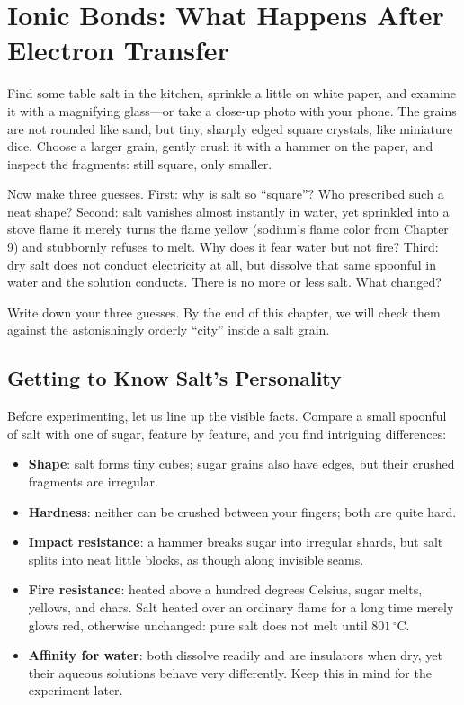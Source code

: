 \chapter{Ionic Bonds: What Happens After Electron Transfer}

\begin{kaichang}
Find some table salt in the kitchen, sprinkle a little on white paper, and examine it with a magnifying glass---or take a close-up photo with your phone. The grains are not rounded like sand, but tiny, sharply edged square crystals, like miniature dice. Choose a larger grain, gently crush it with a hammer on the paper, and inspect the fragments: still square, only smaller.

Now make three guesses. First: why is salt so ``square''? Who prescribed such a neat shape? Second: salt vanishes almost instantly in water, yet sprinkled into a stove flame it merely turns the flame yellow (sodium's flame color from Chapter 9) and stubbornly refuses to melt. Why does it fear water but not fire? Third: dry salt does not conduct electricity at all, but dissolve that same spoonful in water and the solution conducts. There is no more or less salt. What changed?

Write down your three guesses. By the end of this chapter, we will check them against the astonishingly orderly ``city'' inside a salt grain.
\end{kaichang}

\section{Getting to Know Salt's Personality}

Before experimenting, let us line up the visible facts. Compare a small spoonful of salt with one of sugar, feature by feature, and you find intriguing differences:

\begin{itemize}[itemsep=2pt]
\item \textbf{Shape}: salt forms tiny cubes; sugar grains also have edges, but their crushed fragments are irregular.
\item \textbf{Hardness}: neither can be crushed between your fingers; both are quite hard.
\item \textbf{Impact resistance}: a hammer breaks sugar into irregular shards, but salt splits into neat little blocks, as though along invisible seams.
\item \textbf{Fire resistance}: heated above a hundred degrees Celsius, sugar melts, yellows, and chars. Salt heated over an ordinary flame for a long time merely glows red, otherwise unchanged: pure salt does not melt until $801\,^{\circ}\mathrm{C}$.
\item \textbf{Affinity for water}: both dissolve readily and are insulators when dry, yet their aqueous solutions behave very differently. Keep this in mind for the experiment later.
\end{itemize}

